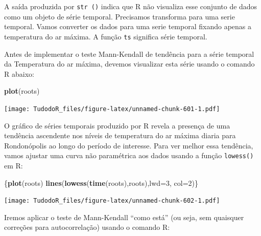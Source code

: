 \documentclass[
]{book}
\newenvironment{Shaded}{\begin{snugshade}}{\end{snugshade}}
\newcommand{\DataTypeTok}[1]{\textcolor[rgb]{0.13,0.29,0.53}{#1}}
\newcommand{\DecValTok}[1]{\textcolor[rgb]{0.00,0.00,0.81}{#1}}
\newcommand{\KeywordTok}[1]{\textcolor[rgb]{0.13,0.29,0.53}{\textbf{#1}}}
\newcommand{\NormalTok}[1]{#1}
\newcommand{\OperatorTok}[1]{\textcolor[rgb]{0.81,0.36,0.00}{\textbf{#1}}}
\begin{document}
A saída produzida por \texttt{str\ ()} indica que R não visualiza esse conjunto de dados como um objeto de série temporal. Precisamos transforma para uma serie temporal.
Vamos converter os dados para uma serie temporal fixando apenas a temperatura do ar máxima. A função \texttt{ts} significa série temporal.

\begin{Shaded}
\end{Shaded}

Antes de implementar o teste Mann-Kendall de tendência para a série temporal da Temperatura do ar máxima, devemos visualizar esta série usando o comando R abaixo:

\begin{Shaded}
\begin{Highlighting}[]
\KeywordTok{plot}\NormalTok{(roots)}
\end{Highlighting}
\end{Shaded}

\texttt{[image: TudodoR\_files/figure-latex/unnamed-chunk-601-1.pdf]}

O gráfico de séries temporais produzido por R revela a presença de uma tendência ascendente nos níveis de temperatura do ar máxima diaria para Rondonópolis ao longo do período de interesse. Para ver melhor essa tendência, vamos ajustar uma curva não paramétrica aos dados usando a função \texttt{lowess()} em R:

\begin{Shaded}
\begin{Highlighting}[]
\NormalTok{\{}\KeywordTok{plot}\NormalTok{(roots)}
\KeywordTok{lines}\NormalTok{(}\KeywordTok{lowess}\NormalTok{(}\KeywordTok{time}\NormalTok{(roots),roots),}\DataTypeTok{lwd=}\DecValTok{3}\NormalTok{, }\DataTypeTok{col=}\DecValTok{2}\NormalTok{)\}}
\end{Highlighting}
\end{Shaded}

\texttt{[image: TudodoR\_files/figure-latex/unnamed-chunk-602-1.pdf]}

Iremos aplicar o teste de Mann-Kendall ``como está'' (ou seja, sem quaisquer correções para autocorrelação) usando o comando R:
\end{document}
